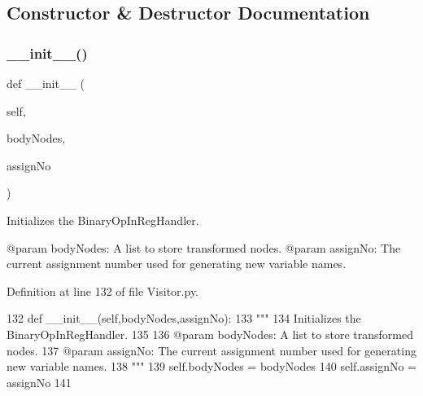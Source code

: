 \subsection{Constructor \& Destructor Documentation}
\mbox{\label{classPostProcessor_1_1Visitor_1_1BinaryOpInRegHandler_a3328eb3718a1907a8a24087b075a2062}} 
\subsubsection{\texorpdfstring{\+\_\+\+\_\+init\+\_\+\+\_\+()}{\_\_init\_\_()}}
{\footnotesize\ttfamily def \+\_\+\+\_\+init\+\_\+\+\_\+ (\begin{DoxyParamCaption}\item[{}]{self,  }\item[{}]{body\+Nodes,  }\item[{}]{assign\+No }\end{DoxyParamCaption})}

\begin{DoxyVerb}Initializes the BinaryOpInRegHandler.

@param bodyNodes: A list to store transformed nodes.
@param assignNo: The current assignment number used for generating new variable names.
\end{DoxyVerb}
 

Definition at line 132 of file Visitor.\+py.


\begin{DoxyCode}
132     \textcolor{keyword}{def }\_\_init\_\_(self,bodyNodes,assignNo):
133         \textcolor{stringliteral}{"""
}
134 \textcolor{stringliteral}{        Initializes the BinaryOpInRegHandler.
}
135 \textcolor{stringliteral}{
}
136 \textcolor{stringliteral}{        @param bodyNodes: A list to store transformed nodes.
}
137 \textcolor{stringliteral}{        @param assignNo: The current assignment number used for generating new variable names.
}
138 \textcolor{stringliteral}{        """}
139         self.bodyNodes = bodyNodes
140         self.assignNo = assignNo
141 
\end{DoxyCode}


